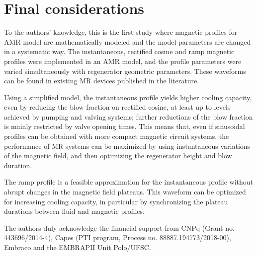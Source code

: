 \documentclass[referee]{svjour3}
\begin{document}
\section{Final considerations}
\label{sec:final-considerations}

To the authors' knowledge, this is the first study where magnetic profiles for AMR model are mathematically modeled and the model parameters are changed in a systematic way. The instantaneous, rectified cosine and ramp magnetic profiles were implemented in an AMR model, and the profile parameters were varied simultaneously with regenerator geometric parameters. These waveforms can be found in existing MR devices published in the literature.

Using a simplified model, the instantaneous profile yields higher cooling capacity, even by reducing the blow fraction on rectified cosine, at least up to levels achieved by pumping and valving systems; further reductions of the blow fraction is mainly restricted by valve opening times. This means that, even if sinusoidal profiles can be obtained with more compact magnetic circuit systems, the performance of MR systems can be maximized by using instantaneous variations of the magnetic field, and then optimizing the regenerator height and blow duration.

The ramp profile is a feasible approximation for the instantaneous
profile without abrupt changes in the magnetic field plateaus. This waveform can be optimized for increasing cooling capacity, in particular by synchronizing the plateau durations between fluid and magnetic profiles.

\begin{acknowledgements}
The authors duly acknowledge the financial support from CNPq (Grant no. 443696/2014-4), Capes (PTI program, Process no. 88887.194773/2018-00), Embraco and the EMBRAPII Unit Polo/UFSC.
\end{acknowledgements}



\end{document}
